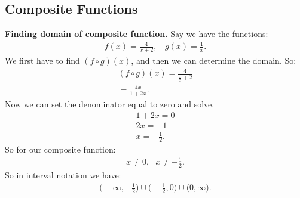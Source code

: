 \documentclass{report}
\begin{document}
    \subsection{Composite Functions}
    \bigbreak \noindent 
    \begin{mdframed}
      \textbf{Finding domain of composite function.}
      \bigbreak \noindent 
      Say we have the functions:
      \begin{align*}
        f(x) = \frac{4}{x+2}, \ \ \ \ g(x) = \frac{1}{x}
      .\end{align*}
      \bigbreak \noindent 
      We first have to find $(f \circ g)(x)$, and then we can determine the domain.
      \bigbreak \noindent 
      So:
      \begin{align*}
        (f \circ g)(x) = \frac{4}{\frac{1}{x}+2} \\
        = \frac{4x}{1+2x}
      .\end{align*}
      \bigbreak \noindent 
      Now we can set the denominator equal to zero and solve.
      \begin{align*}
        1+2x = 0 \\
        2x = -1 \\
        x = -\frac{1}{2}
      .\end{align*}
      \bigbreak \noindent 
      So for our composite function:
      \begin{align*}
        x \neq 0, \ \ \ x \neq -\frac{1}{2}
      .\end{align*}
      \bigbreak \noindent \bigbreak \noindent 
      \bigbreak \noindent 
      So in interval notation we have:
      \begin{align*}
        \bigg(-\infty, -\frac{1}{2}\bigg)\cup \bigg(-\frac{1}{2}, 0 \bigg)\cup \bigg(0,\infty\bigg)
      .\end{align*}
    \end{mdframed}

    \bigbreak \noindent \bigbreak \noindent 
\end{document}
